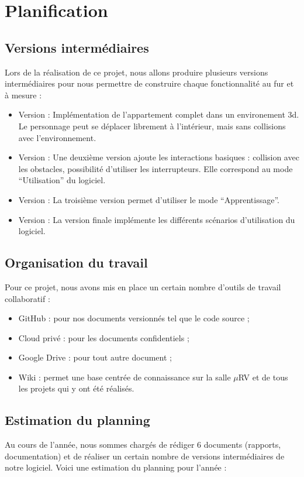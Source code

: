 \section{Planification}
\subsection{Versions intermédiaires}
Lors de la réalisation de ce projet, nous allons produire plusieurs versions intermédiaires pour nous permettre de construire chaque fonctionnalité au fur et à mesure :
\begin{itemize}
  \item Version  : Implémentation de l'appartement complet dans un environement 3d. Le personnage peut se déplacer librement à l'intérieur, mais sans collisions avec l'environnement.
  \item Version  : Une deuxième version ajoute les interactions basiques : collision avec les obstacles, possibilité d'utiliser les interrupteurs. Elle correspond au mode \enquote{Utilisation} du logiciel.
  \item Version  : La troisième version permet d'utiliser le mode \enquote{Apprentissage}.
  \item Version  : La version finale implémente les différents scénarios d'utilisation du logiciel.
\end{itemize}

\subsection{Organisation du travail}
Pour ce projet, nous avons mis en place un certain nombre d'outils de travail collaboratif :

\begin{itemize}
  \item GitHub : pour nos documents versionnés tel que le code source ;
  \item Cloud privé : pour les documents confidentiels ;
  \item Google Drive : pour tout autre document ;
  \item Wiki : permet une base centrée de connaissance sur la salle $\mu$RV et de tous les projets qui y ont été réalisés.
\end{itemize}


\subsection{Estimation du planning}
Au cours de l'année, nous sommes chargés de rédiger 6 documents (rapports, documentation) et de réaliser un certain nombre de versions intermédiaires de notre logiciel.
Voici une estimation du planning pour l'année :
\\
\\

